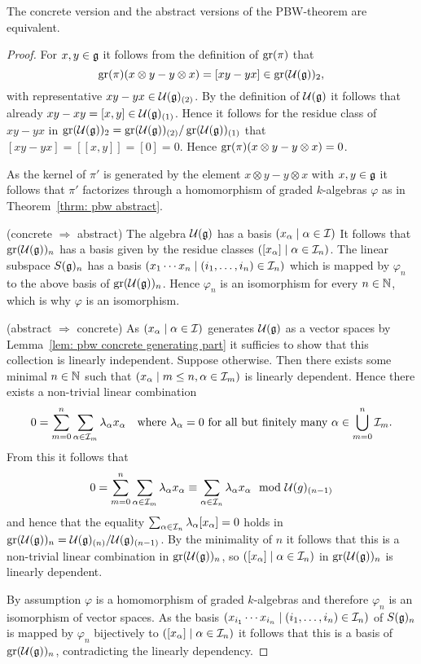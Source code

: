\begin{prop}
 The concrete version and the abstract versions of the PBW-theorem are equivalent.
\end{prop}
\begin{proof}
 For $x, y \in \mathfrak{g}$ it follows from the definition of $\operatorname{gr}(\pi)$ that
 \[
  \operatorname{gr}(\pi)(x \otimes y - y \otimes x) = [xy-yx] \in \operatorname{gr}(\mathcal{U}(\mathfrak{g}))_2,
 \]
 with representative $xy-yx \in \mathcal{U}(\mathfrak{g})_{(2)}$. By the definition of $\mathcal{U}(\mathfrak{g})$ it follows that already \mbox{$xy-xy = [x,y] \in \mathcal{U}(\mathfrak{g})_{(1)}$}. Hence it follows for the residue class of $xy-yx$ in $\operatorname{gr}(\mathcal{U}(\mathfrak{g}))_2 = \operatorname{gr}(\mathcal{U}(\mathfrak{g}))_{(2)}/\operatorname{gr}(\mathcal{U}(\mathfrak{g}))_{(1)}$ that $[xy-yx] = [[x,y]] = [0] = 0$. Hence $\operatorname{gr}(\pi)(x \otimes y - y \otimes x) = 0$.
 
 As the kernel of $\pi'$ is generated by the element $x \otimes y - y \otimes x$ with $x,y \in \mathfrak{g}$ it follows that $\pi'$ factorizes through a homomorphism of graded $k$-algebras $\varphi$ as in Theorem~\ref{thrm: pbw abstract}.
 
 (concrete $\Rightarrow$ abstract) The algebra $\mathcal{U}(\mathfrak{g})$ has a basis $(x_\alpha \mid \alpha \in \mathcal{I})$ It follows that $\operatorname{gr}(\mathcal{U}(\mathfrak{g}))_n$ has a basis given by the residue classes $([x_\alpha] \mid \alpha \in \mathcal{I}_n)$. The linear subspace $S(\mathfrak{g})_n$ has a basis $(x_1 \dotsm x_n \mid (i_1, \dotsc, i_n) \in \mathcal{I}_n)$ which is mapped by $\varphi_n$ to the above basis of $\operatorname{gr}(\mathcal{U}(\mathfrak{g}))_n$. Hence $\varphi_n$ is an isomorphism for every $n \in \mathbb{N}$, which is why $\varphi$ is an isomorphism.
 
 (abstract $\Rightarrow$ concrete) As $(x_\alpha \mid \alpha \in \mathcal{I})$ generates $\mathcal{U}(\mathfrak{g})$ as a vector spaces by Lemma~\ref{lem: pbw concrete generating part} it sufficies to show that this collection is linearly independent. Suppose otherwise. Then there exists some minimal $n \in \mathbb{N}$ such that $(x_\alpha \mid m \leq n, \alpha \in \mathcal{I}_m)$ is linearly dependent. Hence there exists a non-trivial linear combination
 \[
  0 = \sum_{m=0}^n \sum_{\alpha \in \mathcal{I}_m} \lambda_\alpha x_\alpha
 \quad
 \text{where $\lambda_\alpha = 0$ for all but finitely many $\alpha \in \bigcup_{m=0}^n \mathcal{I}_m$}.
 \]
 From this it follows that
 \[
  0
  = \sum_{m=0}^n \sum_{\alpha \in \mathcal{I}_m} \lambda_\alpha x_\alpha
  \equiv \sum_{\alpha \in \mathcal{I}_n} \lambda_\alpha x_\alpha
  \mod {\mathcal{U}}(g)_{(n-1)}
 \]
 and hence that the equality $\sum_{\alpha \in \mathcal{I}_n} \lambda_\alpha [x_\alpha] = 0$ holds in $\operatorname{gr}(\mathcal{U}(\mathfrak{g}))_n = \mathcal{U}(\mathfrak{g})_{(n)}/\mathcal{U}(\mathfrak{g})_{(n-1)}$. By the minimality of $n$ it follows that this is a non-trivial linear combination in $\operatorname{gr}(\mathcal{U}(\mathfrak{g}))_n$, so $([x_\alpha] \mid \alpha \in \mathcal{I}_n)$ in $\operatorname{gr}(\mathcal{U}(\mathfrak{g}))_n$ is linearly dependent.
 
 By assumption $\varphi$ is a homomorphism of graded $k$-algebras and therefore $\varphi_n$ is an isomorphism of vector spaces. As the basis $(x_{i_1} \dotsm x_{i_n} \mid (i_1, \dotsc, i_n) \in \mathcal{I}_n)$ of $S(\mathfrak{g})_n$ is mapped by $\varphi_n$ bijectively to $([x_\alpha] \mid \alpha \in \mathcal{I}_n)$ it follows that this is a basis of $\operatorname{gr}(\mathcal{U}(\mathfrak{g}))_n$, contradicting the linearly dependency.
\end{proof}


